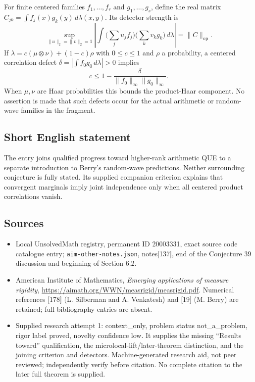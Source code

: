 \documentclass[11pt]{article}
\begin{document}
For finite centered families $f_1,\ldots,f_r$ and $g_1,\ldots,g_s$, define the real matrix $C_{jk}=\int f_j(x)g_k(y)\,d\lambda(x,y)$. Its detector strength is
\[
 \sup_{\|u\|_2=\|v\|_2=1}
 \left|\int\Big(\sum_j u_jf_j\Big)\Big(\sum_kv_kg_k\Big)\,d\lambda\right|
 =\|C\|_{\mathrm{op}}.
\]
If $\lambda=c(\mu\otimes\nu)+(1-c)\rho$ with $0\leq c\leq1$ and $\rho$ a probability, a centered correlation defect $\delta=|\int f_0g_0\,d\lambda|>0$ implies
\[
 c\leq1-\frac{\delta}{\|f_0\|_\infty\|g_0\|_\infty}.
\]
When $\mu,\nu$ are Haar probabilities this bounds the product-Haar component. No assertion is made that such defects occur for the actual arithmetic or random-wave families in the fragment.
\subsection{Short English statement}
The entry joins qualified progress toward higher-rank arithmetic QUE to a separate introduction to Berry's random-wave predictions. Neither surrounding conjecture is fully stated. Its supplied companion criterion explains that convergent marginals imply joint independence only when all centered product correlations vanish.
\subsection{Sources}
\begin{itemize}
\item Local UnsolvedMath registry, permanent ID 20003331, exact source code catalogue entry; \texttt{aim-other-notes.json}, notes[137], end of the Conjecture 39 discussion and beginning of Section 6.2.
\item American Institute of Mathematics, \emph{Emerging applications of measure rigidity}, \url{https://aimath.org/WWN/measrigid/measrigid.pdf}. Numerical references [178] (L. Silberman and A. Venkatesh) and [19] (M. Berry) are retained; full bibliography entries are absent.
\item Supplied research attempt 1: context\_only, problem status not\_a\_problem, rigor label proved, novelty confidence low. It supplies the missing ``Results toward'' qualification, the microlocal-lift/later-theorem distinction, and the joining criterion and detectors. Machine-generated research aid, not peer reviewed; independently verify before citation. No complete citation to the later full theorem is supplied.
\end{itemize}
\end{document}
